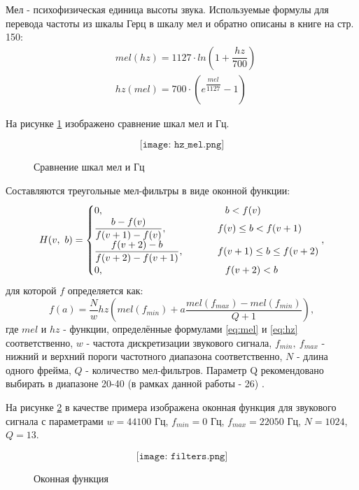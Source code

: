 Мел - психофизическая единица высоты звука. Используемые формулы для перевода частоты из шкалы Герц в шкалу 
мел и обратно описаны в книге \cite{Mel} на стр. 150:
\begin{align}
	\label{eq:mel}
	&mel(hz) = 1127 \cdot ln(1 + \dfrac{hz}{700})\\
	\label{eq:hz}
	&hz(mel) = 700 \cdot (e^{\dfrac{mel}{1127}}-1)
\end{align}

На рисунке \ref{fig:hz_mel} изображено сравнение шкал мел и Гц.

\begin{figure}[H]
	\[\texttt{[image: hz\_mel.png]}\]
	\caption{Сравнение шкал мел и Гц}
	\label{fig:hz_mel}
\end{figure}

Составляются треугольные мел-фильтры в виде оконной функции:
\begin{equation}
	H(v,~b)=
	\begin{cases}
		0, 										     & \Phantom \phantom{-}    b < f(v)\\
		\dfrac{b-f(v)}{f(v+1)-f(v)},   & \Phantom f(v) \leq b < f(v+1)\\
		\dfrac{f(v+2)-b}{f(v+2)-f(v+1)}, & \Phantom f(v+1) \leq b \leq f(v+2)\\
		0,                                           & \Phantom \phantom{-}   f(v+2) < b\\
	\end{cases}
,
\end{equation}
для которой $f$ определяется как:
\begin{equation}
	f(a)=\dfrac{N}{w} hz(mel(f_{min})+a \dfrac{mel(f_{max})-mel(f_{min})}{Q+1}),
\end{equation}
где $mel$ и $hz$ - функции, определённые формулами \eqref{eq:mel} и \eqref{eq:hz} соответственно, $w$ - частота дискретизации звукового сигнала, $f_{min},~f_{max}$ - нижний и верхний пороги частотного диапазона соответственно, $N$ - длина одного фрейма, $Q$ - количество мел-фильтров. Параметр Q рекомендовано выбирать в диапазоне 20-40 (в рамках данной работы - 26) \cite{MFCC}.

На рисунке \ref{fig:filters} в качестве примера изображена оконная функция для звукового сигнала с параметрами $w=44100$ Гц, $f_{min}=0$ Гц, $f_{max}=22050$ Гц, $N=1024$, $Q=13$.

\begin{figure}[H]
	\[\texttt{[image: filters.png]}\]
	\caption{Оконная функция}
	\label{fig:filters}
\end{figure}

